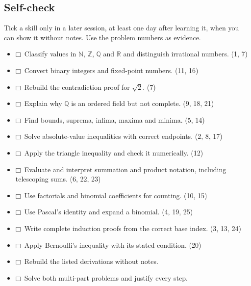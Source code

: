 \documentclass[11pt]{article}
\begin{document}
\begin{keepsection}
\section{Self-check}

Tick a skill only in a later session, at least one day after learning it, when you can show it without notes. Use the problem numbers as evidence.

\begin{itemize}
\item $\mdlgwhtsquare$\ Classify values in \ensuremath{\mathbb{N}}, \ensuremath{\mathbb{Z}}, \ensuremath{\mathbb{Q}} and \ensuremath{\mathbb{R}} and distinguish irrational numbers. (1, 7)
\item $\mdlgwhtsquare$\ Convert binary integers and fixed-point numbers. (11, 16)
\item $\mdlgwhtsquare$\ Rebuild the contradiction proof for \ensuremath{\sqrt{2}}. (7)
\item $\mdlgwhtsquare$\ Explain why \ensuremath{\mathbb{Q}} is an ordered field but not complete. (9, 18, 21)
\item $\mdlgwhtsquare$\ Find bounds, suprema, infima, maxima and minima. (5, 14)
\item $\mdlgwhtsquare$\ Solve absolute-value inequalities with correct endpoints. (2, 8, 17)
\item $\mdlgwhtsquare$\ Apply the triangle inequality and check it numerically. (12)
\item $\mdlgwhtsquare$\ Evaluate and interpret summation and product notation, including telescoping sums. (6, 22, 23)
\item $\mdlgwhtsquare$\ Use factorials and binomial coefficients for counting. (10, 15)
\item $\mdlgwhtsquare$\ Use Pascal’s identity and expand a binomial. (4, 19, 25)
\item $\mdlgwhtsquare$\ Write complete induction proofs from the correct base index. (3, 13, 24)
\item $\mdlgwhtsquare$\ Apply Bernoulli’s inequality with its stated condition. (20)
\item $\mdlgwhtsquare$\ Rebuild the listed derivations without notes.
\item $\mdlgwhtsquare$\ Solve both multi-part problems and justify every step.
\end{itemize}
\end{keepsection}
\end{document}
